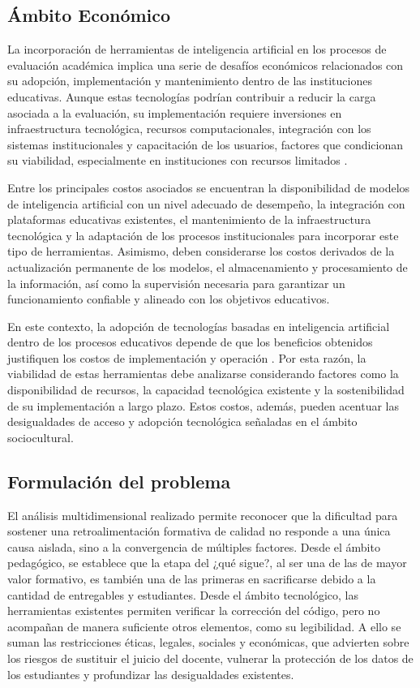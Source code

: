 \documentclass[letterpaper, 10 pt, conference]{ieeeconf}
\begin{document}
\subsection{Ámbito Económico}  

La incorporación de herramientas de inteligencia artificial en los procesos de evaluación académica implica una serie de desafíos económicos relacionados con su adopción, implementación y mantenimiento dentro de las instituciones educativas. Aunque estas tecnologías podrían contribuir a reducir la carga asociada a la evaluación, su implementación requiere inversiones en infraestructura tecnológica, recursos computacionales, integración con los sistemas institucionales y capacitación de los usuarios, factores que condicionan su viabilidad, especialmente en instituciones con recursos limitados \cite{18}. 

Entre los principales costos asociados se encuentran la disponibilidad de modelos de inteligencia artificial con un nivel adecuado de desempeño, la integración con plataformas educativas existentes, el mantenimiento de la infraestructura tecnológica y la adaptación de los procesos institucionales para incorporar este tipo de herramientas. Asimismo, deben considerarse los costos derivados de la actualización permanente de los modelos, el almacenamiento y procesamiento de la información, así como la supervisión necesaria para garantizar un funcionamiento confiable y alineado con los objetivos educativos. 

En este contexto, la adopción de tecnologías basadas en inteligencia artificial dentro de los procesos educativos depende de que los beneficios obtenidos justifiquen los costos de implementación y operación \cite{19}. Por esta razón, la viabilidad de estas herramientas debe analizarse considerando factores como la disponibilidad de recursos, la capacidad tecnológica existente y la sostenibilidad de su implementación a largo plazo. Estos costos, además, pueden acentuar las desigualdades de acceso y adopción tecnológica señaladas en el ámbito sociocultural. 


\subsection{Formulación del problema} 

El análisis multidimensional realizado permite reconocer que la dificultad para sostener una retroalimentación formativa de calidad no responde a una única causa aislada, sino a la convergencia de múltiples factores. Desde el ámbito pedagógico, se establece que la etapa del ¿qué sigue?, al ser una de las de mayor valor formativo, es también una de las primeras en sacrificarse debido a la cantidad de entregables y estudiantes. Desde el ámbito tecnológico, las herramientas existentes permiten verificar la corrección del código, pero no acompañan de manera suficiente otros elementos, como su legibilidad. A ello se suman las restricciones éticas, legales, sociales y económicas, que advierten sobre los riesgos de sustituir el juicio del docente, vulnerar la protección de los datos de los estudiantes y profundizar las desigualdades existentes.
\end{document}
